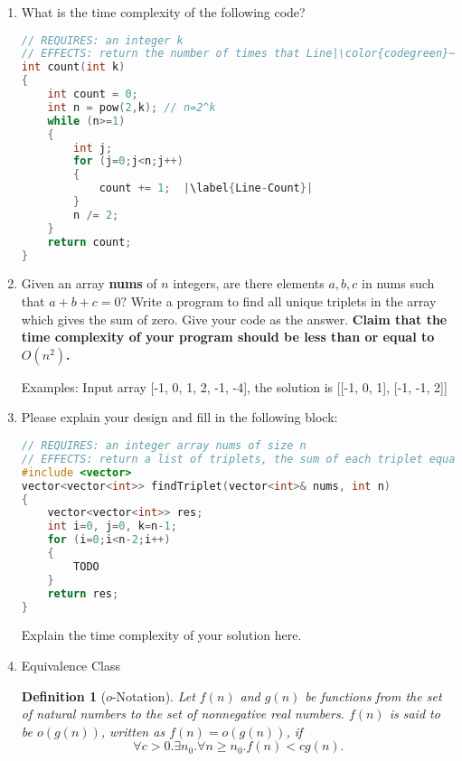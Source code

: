 \documentclass[12pt,a4paper]{article}
\makeatletter
\newtheorem*{solution}{Solution}
\newtheorem{definition}{Definition}
\theoremstyle{definition}
\renewenvironment{solution}[1][Solution] {\par\pushQED{\qed}\normalfont\topsep6\p@\@plus6\p@\relax\trivlist\item[\hskip\labelsep\bfseries#1\@addpunct{.}]\ignorespaces}{\popQED\endtrivlist\@endpefalse} \makeatother
\makeatother
\begin{document}
\begin{enumerate}

\item What is the time complexity of the following code?


\begin{lstlisting}[language=C++]
// REQUIRES: an integer k
// EFFECTS: return the number of times that Line|\color{codegreen}~\ref{Line-Count}| is executed
int count(int k)
{
	int count = 0;
	int n = pow(2,k); // n=2^k
	while (n>=1)
	{
		int j;
   		for (j=0;j<n;j++)
   		{
   			count += 1;  |\label{Line-Count}|	
   		}
   		n /= 2;
	}
	return count;
}
\end{lstlisting}





\item Given an array \textbf{nums} of $n$ integers, are there elements $a, b, c$ in nums such that $a + b + c = 0?$ Write a program to find all unique triplets in the array which gives the sum of zero. Give your code as the answer. \textbf{Claim that the time complexity of your program should be less than or equal to $O(n^2)$.}

{\color{purple}Examples: Input array [-1, 0, 1, 2, -1, -4], the solution is [[-1, 0, 1], [-1, -1, 2]]}



\begin{solution}
Please explain your design and fill in the following block:

	\begin{lstlisting}[language=C++]
// REQUIRES: an integer array nums of size n
// EFFECTS: return a list of triplets, the sum of each triplet equals to 0.
#include <vector>
vector<vector<int>> findTriplet(vector<int>& nums, int n)
{
	vector<vector<int>> res;
	int i=0, j=0, k=n-1;
	for (i=0;i<n-2;i++)
	{
		TODO
	}
	return res;
}
	\end{lstlisting}
Explain the time complexity of your solution here.
\end{solution}

\item Equivalence Class

\begin{definition}[$o$-Notation]
Let $f(n)$ and $g(n)$ be functions from the set of natural numbers to the set of nonnegative real numbers. $f(n)$ is said to be $o(g(n))$, written as $f(n)=o(g(n))$, if
$$\forall c>0.\exists n_{0}.\forall n\ge n_{0}.f(n)<c g(n).$$
\end{definition}


\end{enumerate}
\end{document}
